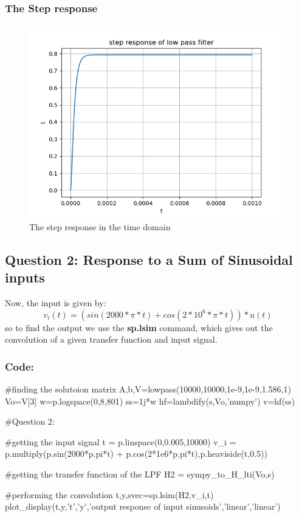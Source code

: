 \documentclass[11pt]{article}
\begin{document}
\subsubsection{The Step response}
\begin{figure}[H]
    \centering
    \includegraphics[scale = 1]{Figure_3.png}
    \caption{The step response in the time domain}
\end{figure}


\subsection{Question 2: Response to a Sum of Sinusoidal inputs}
Now, the input is given by:
\begin{equation}
    v_i(t) = (sin(2000*\pi*t) + cos(2*10^6*\pi*t))*u(t)
\end{equation}
so to find the output we use the \textbf{sp.lsim} command, which gives out the convolution of a given transfer function and input signal.

\subsubsection{Code:}

\begin{python}
#finding the solutoion matrix
A,b,V=lowpass(10000,10000,1e-9,1e-9,1.586,1)
Vo=V[3]
w=p.logspace(0,8,801)
ss=1j*w
hf=lambdify(s,Vo,'numpy')
v=hf(ss)
\end{python}

\begin{python}
#Question 2:

#getting the input signal
t = p.linspace(0,0.005,10000)
v_i = p.multiply(p.sin(2000*p.pi*t) + p.cos(2*1e6*p.pi*t),p.heaviside(t,0.5))

#getting the transfer function of the LPF
H2 = sympy_to_H_lti(Vo,s)

#performing the convolution
t,y,svec=sp.lsim(H2,v_i,t)
plot_display(t,y,'t','y','output response of input sinusoids','linear','linear')
\end{python}
\end{document}
